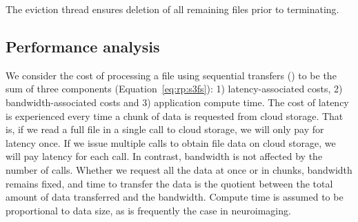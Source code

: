 The eviction thread ensures deletion of all remaining files prior to
terminating.


    
    
                
                


\subsection{Performance analysis}

We consider the cost of processing a file using sequential transfers (\sfs) to
be the sum of three components (Equation~\ref{eq:rp:s3fs}): 1) latency-associated
costs, 2) bandwidth-associated costs and 3) application compute time. The cost
of latency is experienced every time a chunk of data is requested from cloud
storage. That is, if we read a full file in a single call to cloud storage, we
will only pay for latency once. If we issue multiple calls to obtain file data
on cloud storage, we will pay latency for each call. In contrast, bandwidth is
not affected by the number of calls. Whether we request all the data at once or
in chunks, bandwidth remains fixed, and time to transfer the data is the
quotient between the total amount of data transferred and the bandwidth. Compute
time is assumed to be proportional to data size, as is frequently the case in
neuroimaging.


